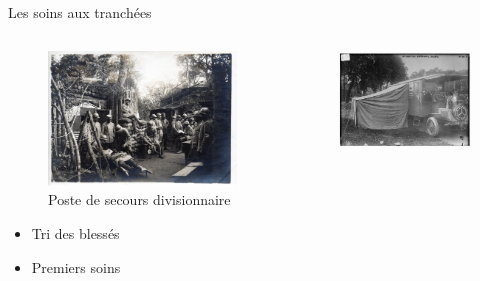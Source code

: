\documentclass{beamer}
\renewcommand{\tiny}{\fontsize{6pt}{7pt}\selectfont}
\renewcommand{\normalsize}{\fontsize{10pt}{12pt}\selectfont}
\renewcommand{\Large}{\fontsize{20pt}{33pt}\selectfont}
\begin{document}
			\begin{frame}
				\Large Les soins aux tranchées \\
				\vskip0.7cm
				\normalsize\itshape
				\begin{columns}
					\begin{column}{0.45\linewidth}
						\begin{figure}
							\includegraphics[width=0.8\linewidth]{pics/II2a}
							
							\caption{\tiny Poste de secours divisionnaire}
						\end{figure}
						\begin{itemize}
							\item Tri des blessés
							\item Premiers soins
						\end{itemize}
					\end{column}
					
					
					\begin{column}{0.45\linewidth}
						\begin{figure}
							\includegraphics[width=0.8\linewidth]{pics/II2b}
							

\end{figure}
\end{column}
\end{columns}
\end{frame}
\end{document}
